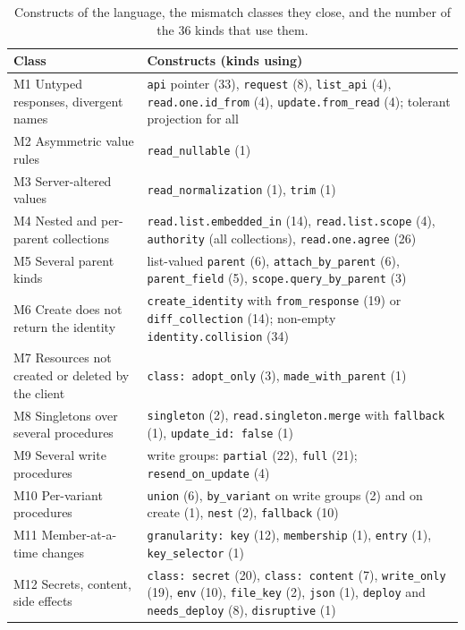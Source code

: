 \begin{table}[tbp]
\centering
\small
\caption{Constructs of the language, the mismatch classes they close, and the
number of the 36 kinds that use them.}
\label{tab:7}
\begin{tabularx}{\linewidth}{LL}
\toprule
Class & Constructs (kinds using) \\
\midrule
M1 Untyped responses, divergent names & \texttt{api} pointer (33), \texttt{request} (8), \texttt{list\_api} (4), \texttt{read.one.id\_from} (4), \texttt{update.from\_read} (4); tolerant projection for all \\
M2 Asymmetric value rules & \texttt{read\_nullable} (1) \\
M3 Server-altered values & \texttt{read\_normalization} (1), \texttt{trim} (1) \\
M4 Nested and per-parent collections & \texttt{read.list.embedded\_in} (14), \texttt{read.list.scope} (4), \texttt{authority} (all collections), \texttt{read.one.agree} (26) \\
M5 Several parent kinds & list-valued \texttt{parent} (6), \texttt{attach\_by\_parent} (6), \texttt{parent\_field} (5), \texttt{scope.query\_by\_parent} (3) \\
M6 Create does not return the identity & \texttt{create\_identity} with \texttt{from\_response} (19) or \texttt{diff\_collection} (14); non-empty \texttt{identity.collision} (34) \\
M7 Resources not created or deleted by the client & \texttt{class:\ adopt\_only} (3), \texttt{made\_with\_parent} (1) \\
M8 Singletons over several procedures & \texttt{singleton} (2), \texttt{read.singleton.merge} with \texttt{fallback} (1), \texttt{update\_id:\ false} (1) \\
M9 Several write procedures & write groups: \texttt{partial} (22), \texttt{full} (21); \texttt{resend\_on\_update} (4) \\
M10 Per-variant procedures & \texttt{union} (6), \texttt{by\_variant} on write groups (2) and on create (1), \texttt{nest} (2), \texttt{fallback} (10) \\
M11 Member-at-a-time changes & \texttt{granularity:\ key} (12), \texttt{membership} (1), \texttt{entry} (1), \texttt{key\_selector} (1) \\
M12 Secrets, content, side effects & \texttt{class:\ secret} (20), \texttt{class:\ content} (7), \texttt{write\_only} (19), \texttt{env} (10), \texttt{file\_key} (2), \texttt{json} (1), \texttt{deploy} and \texttt{needs\_deploy} (8), \texttt{disruptive} (1) \\
\bottomrule
\end{tabularx}
\end{table}
